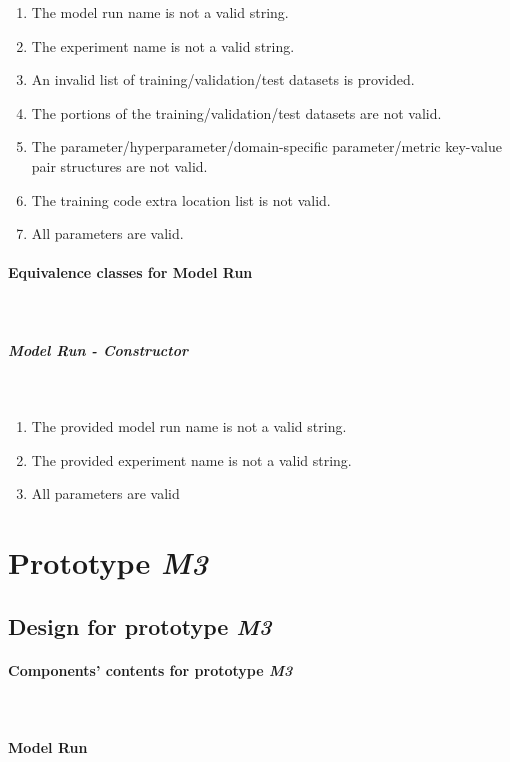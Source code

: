 \begin{enumerate}
    \item The model run name is not a valid string.
    \item The experiment name is not a valid string.
    \item An invalid list of training/validation/test datasets is provided.
    \item The portions of the training/validation/test datasets are not valid.
    \item The parameter/hyperparameter/domain-specific parameter/metric key-value pair structures are not valid.
    \item The training code extra location list is not valid.
    \item All parameters are valid.
\end{enumerate}

\paragraph{Equivalence classes for Model Run}\mbox{}\\

\subparagraph{Model Run - Constructor} \mbox{}\\

\begin{enumerate}
    \item The provided model run name is not a valid string.
    \item The provided experiment name is not a valid string.
    \item All parameters are valid
\end{enumerate}


\section{Prototype \emph{M3}}

\subsection{Design for prototype \emph{M3}}
\paragraph{Components' contents for prototype \emph{M3}} \mbox{} \\

\paragraph{Model Run} \mbox{} \\

